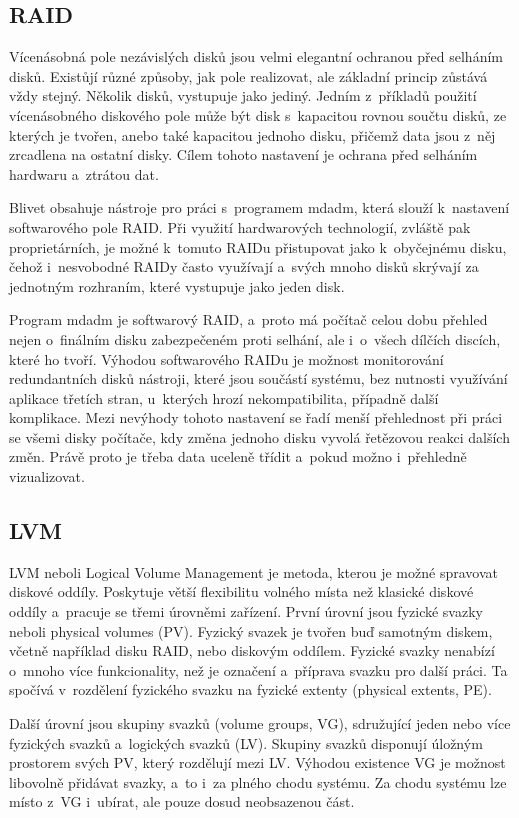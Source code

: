 \documentclass[color,table,oneside,nolot,nolof]{fithesis}
\begin{document}
\subsection{RAID}
	Vícenásobná pole nezávislých disků jsou velmi elegantní ochranou před selháním disků. Existůjí různé způsoby, jak pole realizovat, ale základní princip zůstává vždy stejný. 
	Několik disků, vystupuje jako jediný\cite{RAID}. Jedním z~příkladů použití vícenásobného diskového pole může být disk s~kapacitou rovnou součtu disků, ze kterých je tvořen, anebo také
	kapacitou jednoho disku, přičemž data jsou z~něj zrcadlena na ostatní disky. Cílem tohoto nastavení je ochrana před selháním hardwaru a~ztrátou dat. 
	
	Blivet obsahuje nástroje pro práci s~programem mdadm, která slouží k~nastavení softwarového pole RAID. Při využití hardwarových technologií, zvláště pak proprietárních,
	je možné k~tomuto RAIDu přistupovat jako k~obyčejnému disku, čehož i~nesvobodné RAIDy často využívají a~svých mnoho disků skrývají za jednotným rozhraním, které vystupuje jako jeden
	disk. 

	Program mdadm je softwarový RAID, a~proto má počítač celou dobu přehled nejen o~finálním disku zabezpečeném proti selhání, ale i~o~všech dílčích discích, které ho tvoří. Výhodou
	softwarového RAIDu je
	možnost monitorování redundantních disků nástroji, které jsou součástí systému, bez nutnosti využívání aplikace třetích stran, u~kterých hrozí nekompatibilita, případně další 
	komplikace.
	Mezi nevýhody tohoto nastavení se řadí menší přehlednost při práci se všemi disky počítače, kdy změna jednoho disku vyvolá řetězovou reakci dalších změn. Právě proto je třeba data uceleně třídit
	a~pokud možno i~přehledně vizualizovat.

\subsection{LVM}
  LVM neboli Logical Volume Management je metoda, kterou je možné spravovat diskové oddíly. Poskytuje větší flexibilitu volného místa než klasické diskové oddíly a~pracuje se třemi
	úrovněmi
	zařízení\cite{LVM}. První úrovní jsou fyzické svazky neboli physical volumes (PV). Fyzický svazek je tvořen buď samotným diskem, včetně například disku RAID, nebo diskovým oddílem. 
	Fyzické
	svazky nenabízí o~mnoho více funkcionality, než je označení a~příprava svazku pro další práci. Ta spočívá v~rozdělení fyzického svazku na fyzické extenty (physical extents, PE).

	Další úrovní jsou skupiny svazků (volume groups, VG), sdružující jeden nebo více fyzických svazků a~logických svazků (LV). Skupiny svazků disponují úložným prostorem svých PV, 
	který rozdělují mezi LV. Výhodou existence VG je možnost libovolně přidávat svazky, a~to i~za plného chodu systému. Za chodu systému lze místo z~VG i~ubírat, ale 
	pouze dosud neobsazenou část. 
\end{document}
